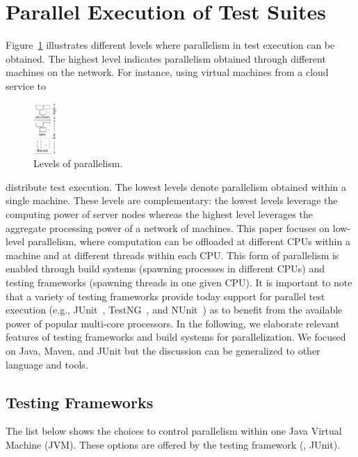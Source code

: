 \section{Parallel Execution of Test Suites}
\label{sec:modes}

Figure~\ref{fig:levels} illustrates different levels where
parallelism in test execution can be obtained.
The highest level indicates
parallelism obtained through different machines on the
network.  For instance, using virtual machines from a cloud service to
\begin{figure}  
  \centering
  \includegraphics[width=0.08\textwidth]{figs/parallel-levels-short.pdf}  
  \caption{\label{fig:levels}Levels of parallelism.}
\end{figure}
distribute test execution.  The lowest levels denote parallelism
obtained within a single machine.  These levels are complementary:
the lowest levels leverage the computing power of server
nodes whereas the highest level leverages the aggregate processing
power of a network of machines.
This paper focuses on low-level parallelism, where computation can be
offloaded at different CPUs within a machine and at different threads
within each CPU.  This form of parallelism is enabled through build
systems (spawning processes in different CPUs) and testing frameworks
(spawning threads in one given CPU).  It is important to note that a variety
of testing frameworks provide today support for parallel test
execution (e.g., JUnit~\cite{junit-org}, TestNG~\cite{testng}, and
NUnit~\cite{nunit}) as to benefit from the available power of popular multi-core processors.
In the following, we elaborate relevant features of testing frameworks
and build systems for parallelization.  We focused on Java, Maven, and JUnit but the
discussion can be generalized to other language and tools.

\subsection{Testing Frameworks}
\label{sec:frameworks}

The list below shows the choices to control parallelism within one
Java Virtual Machine (JVM).  These options are offered by the testing
framework (\eg{}, JUnit).

